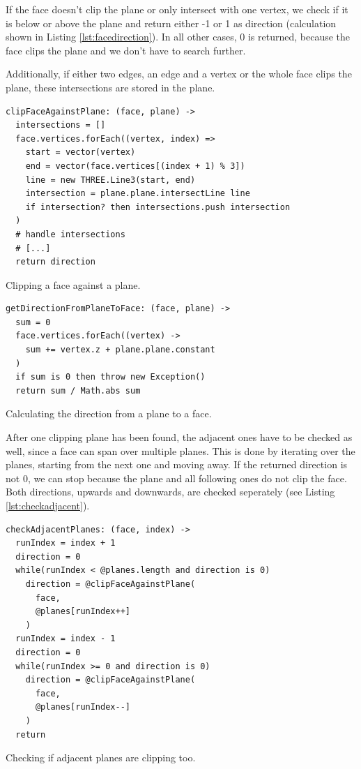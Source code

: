 \documentclass[../ClassicThesis.tex]{subfiles}
\begin{document}
If the face doesn't clip the plane or only intersect with one vertex, we check if it is below or above the plane and return either -1 or 1 as direction (calculation shown in Listing \ref{lst:facedirection}). In all other cases, 0 is returned, because the face clips the plane and we don't have to search further. 

Additionally, if either two edges, an edge and a vertex or the whole face clips the plane, these intersections are stored in the plane.

\begin{listing}
\begin{verbatim}
clipFaceAgainstPlane: (face, plane) ->
  intersections = []
  face.vertices.forEach((vertex, index) =>
    start = vector(vertex)
    end = vector(face.vertices[(index + 1) % 3])
    line = new THREE.Line3(start, end)
    intersection = plane.plane.intersectLine line
    if intersection? then intersections.push intersection
  )
  # handle intersections
  # [...]
  return direction
\end{verbatim}
\caption{Clipping a face against a plane.}
\label{lst:clipfaceplane}
\end{listing}

\begin{listing}
\begin{verbatim}
getDirectionFromPlaneToFace: (face, plane) ->
  sum = 0
  face.vertices.forEach((vertex) ->
    sum += vertex.z + plane.plane.constant
  )
  if sum is 0 then throw new Exception()
  return sum / Math.abs sum
\end{verbatim}
\caption{Calculating the direction from a plane to a face.}
\label{lst:facedirection}
\end{listing}

After one clipping plane has been found, the adjacent ones have to be checked as well, since a face can span over multiple planes. This is done by iterating over the planes, starting from the next one and moving away. If the returned direction is not 0, we can stop because the plane and all following ones do not clip the face. Both directions, upwards and downwards, are checked seperately (see Listing \ref{lst:checkadjacent}).

\begin{listing}
\begin{verbatim}
checkAdjacentPlanes: (face, index) ->
  runIndex = index + 1
  direction = 0
  while(runIndex < @planes.length and direction is 0)
    direction = @clipFaceAgainstPlane(
      face, 
      @planes[runIndex++]
    )
  runIndex = index - 1
  direction = 0
  while(runIndex >= 0 and direction is 0)
    direction = @clipFaceAgainstPlane(
      face, 
      @planes[runIndex--]
    )
  return
\end{verbatim}
\caption{Checking if adjacent planes are clipping too.}
\label{lst:checkadjacent}
\end{listing}
\end{document}
